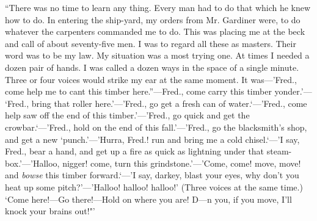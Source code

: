 {``There was no time to learn any thing. Every man had to do that which
he knew how to do. In entering the ship-yard, my orders from Mr.
Gardiner were, to do whatever the carpenters commanded me to do. This
was placing me at the beck and call of about seventy-five men. I was to
regard all these as masters. Their word was to be my law. My situation
was a most trying one. At times I needed a dozen pair of hands. I was
called a dozen ways in the space of a single minute. Three or four
voices would strike my ear at the same moment. It was---'Fred., come
help me to cant this timber here.''---Fred., come carry this timber
yonder.'---} {\protect\hypertarget{309}{}{}}{`Fred., bring that roller
here.'---'Fred., go get a fresh can of water.`---'Fred., come help saw
off the end of this timber.'---'Fred., go quick and get the
crowbar.`---'Fred., hold on the end of this fall.'---'Fred., go the
blacksmith's shop, and get a new `punch.'---'Hurra, Fred.! run and bring
me a cold chisel.`---'I say, Fred., bear a hand, and get up a fire as
quick as lightning under that steam-box.'---'Halloo, nigger! come, turn
this grindstone.'---'Come, come! move, move! and \emph{bowse} this
timber forward.`---'I say, darkey, blast your eyes, why don't you heat
up some pitch?'---'Halloo! halloo! halloo!' (Three voices at the same
time.) `Come here!---Go there!---Hold on where you are! D---n you, if
you move, I'll knock your brains out!"'}

